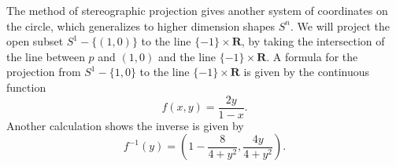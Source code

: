\begin{example}

    The method of stereographic projection gives another system of coordinates on the circle, which generalizes to higher dimension shapes $S^n$. We will project the open subset $S^1 - \{ (1,0) \}$ to the line $\{ -1 \} \times \mathbf{R}$, by taking the intersection of the line between $p$ and $(1,0)$ and the line $\{ -1 \} \times \mathbf{R}$. A formula for the projection from $S^1 - \{ 1, 0 \}$ to the line $\{ -1 \} \times \mathbf{R}$ is given by the continuous function
    \[ f(x,y) = \frac{2y}{1-x}. \]
    Another calculation shows the inverse is given by
    \[ f^{-1}(y) = \left(1 - \frac{8}{4 + y^2} , \frac{4y}{4 + y^2} \right). \]
%

\end{example}
